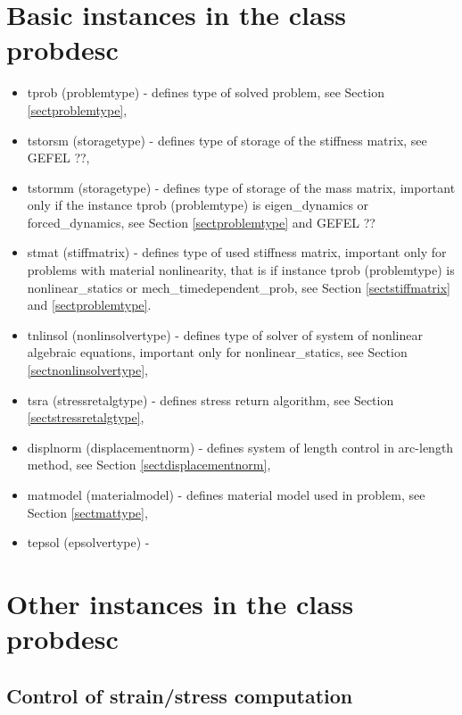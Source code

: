\section{Basic instances in the class probdesc}
\begin{itemize}
\item{tprob (problemtype) - defines type of solved problem, see Section \ref{sectproblemtype},}

\item{tstorsm (storagetype) - defines type of storage of the stiffness matrix, see GEFEL ??,}

\item{tstormm (storagetype) - defines type of storage of the mass matrix, important only if the instance
tprob (problemtype) is eigen\_dynamics or forced\_dynamics, see Section \ref{sectproblemtype} and GEFEL ??}

\item{stmat (stiffmatrix) - defines type of used stiffness matrix, important only for problems with
material nonlinearity, that is if instance tprob (problemtype) is nonlinear\_statics or mech\_timedependent\_prob,
see Section \ref{sectstiffmatrix} and \ref{sectproblemtype}.}

\item{tnlinsol (nonlinsolvertype) - defines type of solver of system of nonlinear algebraic equations, important only
for nonlinear\_statics, see Section \ref{sectnonlinsolvertype},}

\item{tsra (stressretalgtype) - defines stress return algorithm, see Section \ref{sectstressretalgtype},}

\item{displnorm (displacementnorm) - defines system of length control in arc-length method,
see Section \ref{sectdisplacementnorm},}

\item{matmodel (materialmodel) - defines material model used in problem, see Section \ref{sectmattype},}

\item{tepsol (epsolvertype) - }
\end{itemize}


\section{Other instances in the class probdesc}

\subsection{Control of strain/stress computation}

